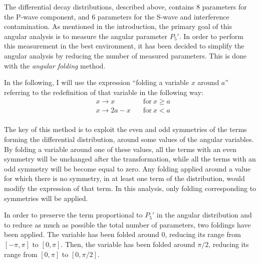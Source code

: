 
The differential decay distributions, described above, contains 8 parameters for the P-wave component, and 6 parameters for the S-wave and interference contamination.
As mentioned in the introduction, the primary goal of this angular analysis is to measure the angular parameter $P_5'$.
In order to perform this measurement in the best environment, it has been decided to simplify the angular analysis by reducing the number of measured parameters.
This is done with the \textit{angular folding} method.

In the following, I will use the expression ``folding a variable $x$ around $a$'' referring to the redefinition of that variable in the following way:
\begin{equation} \label{eq:folding-def}
  \begin{aligned}
    & x \to x \quad & \textrm{for}\: x \ge a \\ 
    & x \to 2a-x \quad & \textrm{for}\: x < a \\ 
  \end{aligned}
\end{equation}

The key of this method is to exploit the even and odd symmetries of the terms forming the differential distribution, around some values of the angular variables.
By folding a variable around one of these values, all the terms with an even symmetry will be unchanged after the transformation, while all the terms with an odd symmetry will be become equal to zero.
Any folding applied around a value for which there is no symmetry, in at least one term of the distribution, would modify the expression of that term.
In this analysis, only folding corresponding to symmetries will be applied.

In order to preserve the term proportional to $P_5'$ in the angular distribution and to reduce as much as possible the total number of parameters, two foldings have been applied.
The \PHI variable has been folded around 0, reducing its range from $\left[-\pi,\pi\right]$ to $\left[0,\pi\right]$.
Then, the \TL variable has been folded around $\pi/2$, reducing its range from $\left[0,\pi\right]$ to $\left[0,\pi/2\right]$.

